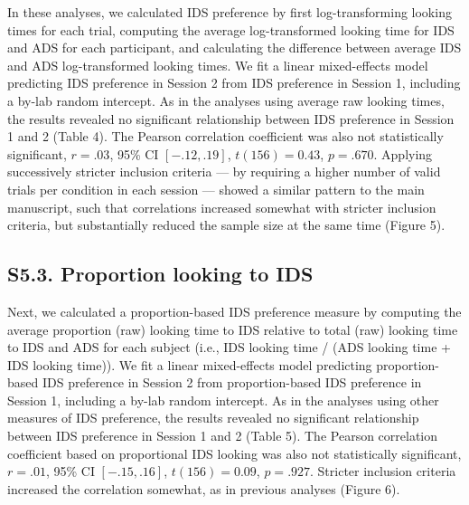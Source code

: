 \documentclass[
  english,
  man, donotrepeattitle,floatsintext]{apa6}
\begin{document}
In these analyses, we calculated IDS preference by first log-transforming looking times for each trial, computing the average log-transformed looking time for IDS and ADS for each participant, and calculating the difference between average IDS and ADS log-transformed looking times.
We fit a linear mixed-effects model predicting IDS preference in Session 2 from IDS preference in Session 1, including a by-lab random intercept.
As in the analyses using average raw looking times, the results revealed no significant relationship between IDS preference in Session 1 and 2 (Table 4).
The Pearson correlation coefficient was also not statistically significant, \(r = .03\), 95\% CI \([-.12, .19]\), \(t(156) = 0.43\), \(p = .670\).
Applying successively stricter inclusion criteria --- by requiring a higher number of valid trials per condition in each session --- showed a similar pattern to the main manuscript, such that correlations increased somewhat with stricter inclusion criteria, but substantially reduced the sample size at the same time (Figure 5).

\hypertarget{s5.3.-proportion-looking-to-ids}{%
\subsection{S5.3. Proportion looking to IDS}\label{s5.3.-proportion-looking-to-ids}}

Next, we calculated a proportion-based IDS preference measure by computing the average proportion (raw) looking time to IDS relative to total (raw) looking time to IDS and ADS for each subject (i.e., IDS looking time / (ADS looking time + IDS looking time)).
We fit a linear mixed-effects model predicting proportion-based IDS preference in Session 2 from proportion-based IDS preference in Session 1, including a by-lab random intercept.
As in the analyses using other measures of IDS preference, the results revealed no significant relationship between IDS preference in Session 1 and 2 (Table 5).
The Pearson correlation coefficient based on proportional IDS looking was also not statistically significant, \(r = .01\), 95\% CI \([-.15, .16]\), \(t(156) = 0.09\), \(p = .927\).
Stricter inclusion criteria increased the correlation somewhat, as in previous analyses (Figure 6).
\end{document}
